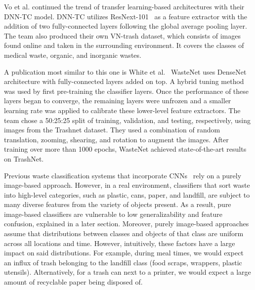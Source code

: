 \documentclass[conference]{ieeeconf}
\begin{document}
Vo et al. \cite{Vo2019} continued the trend of transfer learning-based architectures with their DNN-TC model. DNN-TC utilizes ResNext-101~\cite{ResNext} as a feature extractor with the addition of two fully-connected layers following the global average pooling layer. The team also produced their own VN-trash dataset, which consists of images found online and taken in the surrounding environment. It covers the classes of medical waste, organic, and inorganic wastes. 


A publication most similar to this one is White et al.~\cite{White2020} WasteNet uses DenseNet architecture with fully-connected layers added on top. A hybrid tuning method was used by first pre-training the classifier layers. Once the performance of these layers began to converge, the remaining layers were unfrozen and a smaller learning rate was applied to calibrate these lower-level feature extractors. The team chose a 50:25:25 split of training, validation, and testing, respectively, using images from the Trashnet dataset. They used a combination of random translation, zooming, shearing, and rotation to augment the images. After training over more than 1000 epochs, WasteNet achieved state-of-the-art results on TrashNet. 

Previous waste classification systems that incorporate CNNs~\cite{Aral2019, Yang2016, Vo2019, White2020, Yang2020, Knowles} rely on a purely image-based approach. However, in a real environment, classifiers that sort waste into high-level categories, such as plastic, cans, paper, and landfill, are subject to many diverse features from the variety of objects present. As a result, pure image-based classifiers are vulnerable to low generalizability and feature confusion, explained in a later section. Moreover, purely image-based approaches assume that distributions between classes and objects of that class are uniform across all locations and time. However, intuitively, these factors have a large impact on said distributions. For example, during meal times, we would expect an influx of trash belonging to the landfill class (food scraps, wrappers, plastic utensils). Alternatively, for a trash can next to a printer, we would expect a large amount of recyclable paper being disposed of.
\end{document}
